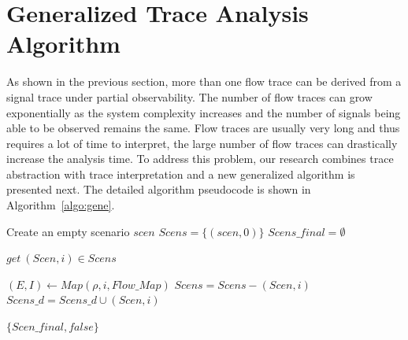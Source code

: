\documentclass[12pt,frontmatter,copyright,thesis]{usfmanus}
\begin{document}
%
%
%




\section{Generalized Trace Analysis Algorithm}%

As shown in the previous section,
more
than one flow trace can be derived from
a signal trace under partial observability.
The number of flow traces can
grow exponentially as the system
complexity increases and the number of
signals being able to be observed remains
the same.
Flow traces are usually very long
and thus requires a lot of time
to interpret, the large number
of flow traces can drastically
increase the analysis time.
To address this problem,
our research combines trace abstraction
with trace interpretation and
a new generalized algorithm is
presented next.
 The detailed algorithm pseudocode
is shown in Algorithm~\ref{algo:gene}.

\begin{algorithm}
\DontPrintSemicolon
Create an empty scenario $scen$\;
$\mathit{Scens} = \{(scen,0)\}$\;
$Scens\_final=\emptyset$\;
 {
 	$get\ (Scen,i)\in Scens$\;
	
	$(E,I)\gets Map(\rho,i,Flow\_Map)$ \;
	$Scens= Scens - (Scen,i)$\;
	$Scens\_d=Scens\_d\cup (Scen,i)$\;
 }
{
\Return $\{Scen\_final, false\}$\;}
\caption{$\textsc{Generalized-Check-Compliance}(\vec{F}, \, \rho)$ }
\label{algo:gene}
\end{algorithm}
\end{document}
